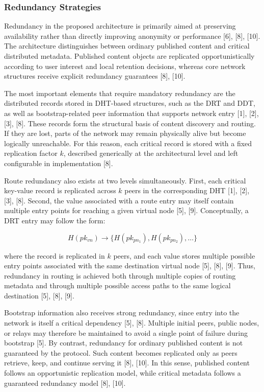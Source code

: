 \documentclass[12pt,a4paper]{article}
\begin{document}
\subsubsection{Redundancy Strategies}

Redundancy in the proposed architecture is primarily aimed at preserving availability rather than directly improving anonymity or performance [6], [8], [10]. The architecture distinguishes between ordinary published content and critical distributed metadata. Published content objects are replicated opportunistically according to user interest and local retention decisions, whereas core network structures receive explicit redundancy guarantees [8], [10].

The most important elements that require mandatory redundancy are the distributed records stored in DHT-based structures, such as the DRT and DDT, as well as bootstrap-related peer information that supports network entry [1], [2], [3], [8]. These records form the structural basis of content discovery and routing. If they are lost, parts of the network may remain physically alive but become logically unreachable. For this reason, each critical record is stored with a fixed replication factor \(k\), described generically at the architectural level and left configurable in implementation [8].

Route redundancy also exists at two levels simultaneously. First, each critical key-value record is replicated across \(k\) peers in the corresponding DHT [1], [2], [3], [8]. Second, the value associated with a route entry may itself contain multiple entry points for reaching a given virtual node [5], [9]. Conceptually, a DRT entry may follow the form:

\[
H(pk_{vn}) \rightarrow \{H(pk_{pn_1}), H(pk_{pn_2}), \dots \}
\]

where the record is replicated in \(k\) peers, and each value stores multiple possible entry points associated with the same destination virtual node [5], [8], [9]. Thus, redundancy in routing is achieved both through multiple copies of routing metadata and through multiple possible access paths to the same logical destination [5], [8], [9].

Bootstrap information also receives strong redundancy, since entry into the network is itself a critical dependency [5], [8]. Multiple initial peers, public nodes, or relays may therefore be maintained to avoid a single point of failure during bootstrap [5]. By contrast, redundancy for ordinary published content is not guaranteed by the protocol. Such content becomes replicated only as peers retrieve, keep, and continue serving it [8], [10]. In this sense, published content follows an opportunistic replication model, while critical metadata follows a guaranteed redundancy model [8], [10].
\end{document}
